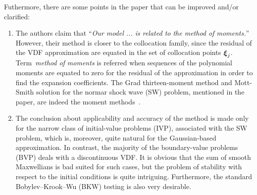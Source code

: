 \documentclass[11pt]{article}
\newcommand{\Ma}{\mathrm{Ma}}
\newcommand{\bxi}{\vb*{\xi}}
\begin{document}
Futhermore, there are some points in the paper that can be improved and/or clarified:
\begin{enumerate}
    \item The authors claim that ``\emph{Our model ... is related to the method of moments.}''
    However, their method is closer to the collocation family, since the residual of the VDF approximation
    are equated in the set of collocation points $\bxi_j$.
    Term~\emph{method of moments} is referred when sequences of the polynomial moments are equated to zero
    for the residual of the approximation in order to find the expansion coefficients.
    The Grad thirteen-moment method and Mott-Smith solution for the normar shock wave (SW) problem,
    mentioned in the paper, are indeed the moment methods~\cite{Sone2007}.

    \item The conclusion about applicability and accuracy of the method is made only
    for the narrow class of initial-value problems (IVP), associated with the SW problem,
    which is, moreover, quite natural for the Gaussian-based approximation.
    In contrast, the majority of the boundary-value problems (BVP) deals with a discontinuous VDF.
    It is obvious that the sum of smooth Maxwellians is bad suited for such cases,
    but the problem of stability with respect to the initial conditions is quite intriguing.
    Furthermore, the standard Bobylev--Krook--Wu (BKW) testing is also very desirable.



\end{enumerate}
\end{document}
